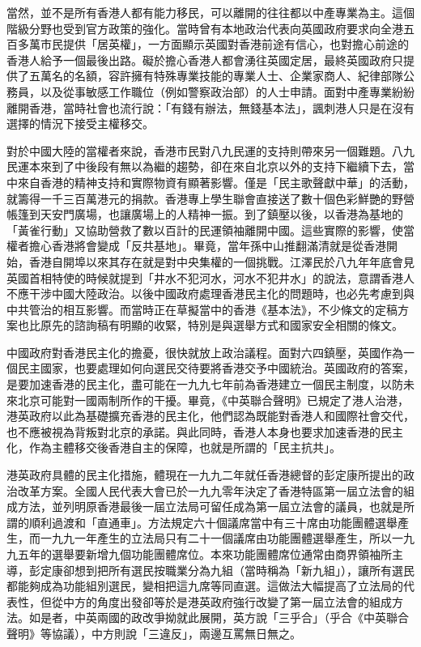當然，並不是所有香港人都有能力移民，可以離開的往往都以中產專業為主。這個階級分野也受到官方政策的強化。當時曾有本地政治代表向英國政府要求向全港五百多萬市民提供「居英權」，一方面顯示英國對香港前途有信心，也對擔心前途的香港人給予一個最後出路。礙於擔心香港人都會湧往英國定居，最終英國政府只提供了五萬名的名額，容許擁有特殊專業技能的專業人士、企業家商人、紀律部隊公務員，以及從事敏感工作職位（例如警察政治部）的人士申請。面對中產專業紛紛離開香港，當時社會也流行說：「有錢有辦法，無錢基本法」，諷刺港人只是在沒有選擇的情況下接受主權移交。

對於中國大陸的當權者來說，香港市民對八九民運的支持則帶來另一個難題。八九民運本來到了中後段有無以為繼的趨勢，卻在來自北京以外的支持下繼續下去，當中來自香港的精神支持和實際物資有顯著影響。僅是「民主歌聲獻中華」的活動，就籌得一千三百萬港元的捐款。香港專上學生聯會直接送了數十個色彩鮮艷的野營帳篷到天安門廣場，也讓廣場上的人精神一振。到了鎮壓以後，以香港為基地的「黃雀行動」又協助營救了數以百計的民運領袖離開中國。這些實際的影響，使當權者擔心香港將會變成「反共基地」。畢竟，當年孫中山推翻滿清就是從香港開始，香港自開埠以來其存在就是對中央集權的一個挑戰。江澤民於八九年年底會見英國首相特使的時候就提到「井水不犯河水，河水不犯井水」的說法，意謂香港人不應干涉中國大陸政治。以後中國政府處理香港民主化的問題時，也必先考慮到與中共管治的相互影響。而當時正在草擬當中的香港《基本法》，不少條文的定稿方案也比原先的諮詢稿有明顯的收緊，特別是與選舉方式和國家安全相關的條文。

中國政府對香港民主化的擔憂，很快就放上政治議程。面對六四鎮壓，英國作為一個民主國家，也要處理如何向選民交待要將香港交予中國統治。英國政府的答案，是要加速香港的民主化，盡可能在一九九七年前為香港建立一個民主制度，以防未來北京可能對一國兩制所作的干擾。畢竟，《中英聯合聲明》已規定了港人治港，港英政府以此為基礎擴充香港的民主化，他們認為既能對香港人和國際社會交代，也不應被視為背叛對北京的承諾。與此同時，香港人本身也要求加速香港的民主化，作為主體移交後香港自主的保障，也就是所謂的「民主抗共」。

港英政府具體的民主化措施，體現在一九九二年就任香港總督的彭定康所提出的政治改革方案。全國人民代表大會已於一九九零年決定了香港特區第一屆立法會的組成方法，並列明原香港最後一屆立法局可留任成為第一屆立法會的議員，也就是所謂的順利過渡和「直通車」。方法規定六十個議席當中有三十席由功能團體選舉產生，而一九九一年產生的立法局只有二十一個議席由功能團體選舉產生，所以一九九五年的選舉要新增九個功能團體席位。本來功能團體席位通常由商界領袖所主導，彭定康卻想到把所有選民按職業分為九組（當時稱為「新九組」），讓所有選民都能夠成為功能組別選民，變相把這九席等同直選。這做法大幅提高了立法局的代表性，但從中方的角度出發卻等於是港英政府強行改變了第一屆立法會的組成方法。如是者，中英兩國的政改爭拗就此展開，英方說「三乎合」（乎合《中英聯合聲明》等協議），中方則說「三違反」，兩邊互罵無日無之。

